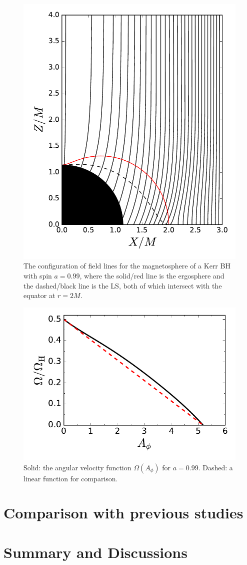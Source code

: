 \documentclass[aps,prd,reprint,nofootinbib, superscriptaddress]{revtex4-1}
\def\Ap{A_\phi}
\begin{document}
\begin{figure}
\includegraphics[scale=0.55]{f1}
\caption{\label{fig:field_lines} The configuration of field lines for the magnetosphere of a Kerr BH with spin $a=0.99$,
where the solid/red line is the ergosphere and the dashed/black line is the LS, both of which intersect with
the equator at $r=2 M$. }
\end{figure}

\begin{figure}
\includegraphics[scale=0.6]{f2}
\caption{\label{fig:omega} Solid: the angular velocity function $\Omega(\Ap)$ for $a=0.99$.
Dashed: a linear function for comparison.}
\end{figure}

\section{Comparison with previous studies}

\section{Summary and Discussions}


\end{document}
